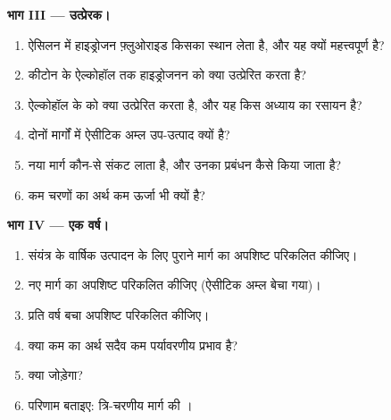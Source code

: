 \begin{problem}
\medskip\noindent\textbf{भाग III --- उत्प्रेरक।}
\begin{enumerate}[resume]
  \item ऐसिलन में हाइड्रोजन फ़्लुओराइड किसका स्थान लेता है, और यह क्यों महत्त्वपूर्ण है?
  \item कीटोन के ऐल्कोहॉल तक हाइड्रोजनन को क्या उत्प्रेरित करता है?
  \item ऐल्कोहॉल के  को क्या उत्प्रेरित करता है, और यह किस अध्याय का रसायन
        है?
  \item दोनों मार्गों में ऐसीटिक अम्ल उप-उत्पाद क्यों है?
  \item नया मार्ग कौन-से संकट लाता है, और उनका प्रबंधन कैसे किया जाता है?
  \item कम चरणों का अर्थ कम ऊर्जा भी क्यों है?
\end{enumerate}

\medskip\noindent\textbf{भाग IV --- एक वर्ष।}
\begin{enumerate}[resume]
  \item संयंत्र के वार्षिक उत्पादन के लिए पुराने मार्ग का अपशिष्ट परिकलित कीजिए।
  \item नए मार्ग का अपशिष्ट परिकलित कीजिए (ऐसीटिक अम्ल बेचा गया)।
  \item प्रति वर्ष बचा अपशिष्ट परिकलित कीजिए।
  \item क्या कम  का अर्थ सदैव कम पर्यावरणीय प्रभाव है?
  \item {} क्या जोड़ेगा?
  \item परिणाम बताइए: त्रि-चरणीय मार्ग की ।
\end{enumerate}
\end{problem}

